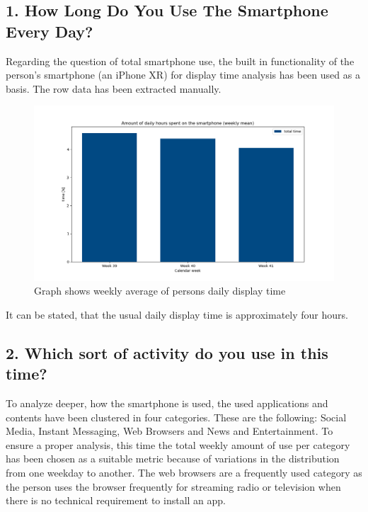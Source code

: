 \subsection*{1. How Long Do You Use The Smartphone Every Day?}
Regarding the question of total smartphone use, the built in functionality of the person's smartphone (an iPhone XR) for display time analysis has been used as a basis. The row data has been extracted manually. 

\begin{figure}[h]
\centering
\includegraphics[width = \textwidth]{../data/usage-times-total.png}
\caption{Graph shows weekly average of persons daily display time}
\end{figure}

It can be stated, that the usual daily display time is approximately four hours.

\subsection*{2. Which sort of activity do you use in this time?}
To analyze deeper, how the smartphone is used, the used applications and contents have been clustered in four categories. These are the following: Social Media, Instant Messaging, Web Browsers and News and Entertainment. To ensure a proper analysis, this time the total weekly amount of use per category has been chosen as a suitable metric because of variations in the distribution from one weekday to another. The web browsers are a frequently used category as the person uses the browser frequently for streaming radio or television when there is no technical requirement to install an app.

